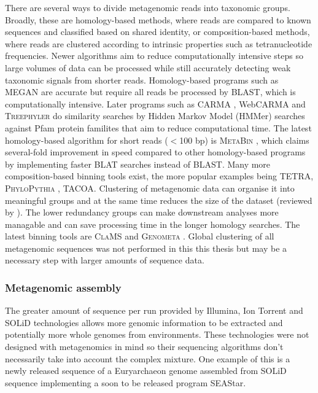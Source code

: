 There are several ways to divide metagenomic reads into taxonomic groups.
Broadly, these are homology-based methods, where reads are compared to known sequences and classified based on shared identity, or composition-based methods, where reads are clustered according to intrinsic properties such as tetranucleotide frequencies.
Newer algorithms aim to reduce computationally intensive steps so large volumes of data can be processed while still accurately detecting weak taxonomic signals from shorter reads. 
Homology-based programs such as \textsc{MEGAN} \cite{Huson2007} are accurate but require all reads be processed by \acs{BLAST}, which is computationally intensive.
Later programs such as \textsc{CARMA} \cite{Krause2008}, WebCARMA \cite{Gerlach2009} and \textsc{Treephyler} do similarity searches by Hidden Markov Model (HMMer) searches against Pfam protein familites that aim to reduce computational time. 
The latest homology-based algorithm for short reads ($<$100 bp) is \textsc{MetaBin} \cite{Sharma2012}, which claims several-fold improvement in speed compared to other homology-based programs by implementing faster \textsc{BLAT} searches \cite{Kent2002} instead of \acs{BLAST}.
Many more composition-based binning tools exist, the more popular examples being \textsc{TETRA}, \textsc{PhyloPythia} \cite{McHardy2007}, \textsc{TACOA}.
Clustering of metagenomic data can organise it into meaningful groups and at the same time reduces the size of the dataset (reviewed by \citet{Li2012}).
The lower redundancy groups can make downstream analyses more managable and can save processing time in the longer homology searches.
The latest binning tools are \textsc{ClaMS} \cite{Pati2011} and \textsc{Genometa} \cite{Davenport2012}.
Global clustering of all metagenomic sequences was not performed in this this thesis but may be a necessary step with larger amounts of sequence data.


\subsubsection{Metagenomic assembly}
The greater amount of sequence per run provided by Illumina, Ion Torrent and SOLiD technologies allows more genomic information to be extracted and potentially more whole genomes from environments.
These technologies were not designed with metagenomics in mind so their sequencing algorithms don't necessarily take into account the complex mixture.
One example of this is a newly released sequence of a Euryarchaeon genome assembled from SOLiD sequence implementing a soon to be released program SEAStar.


